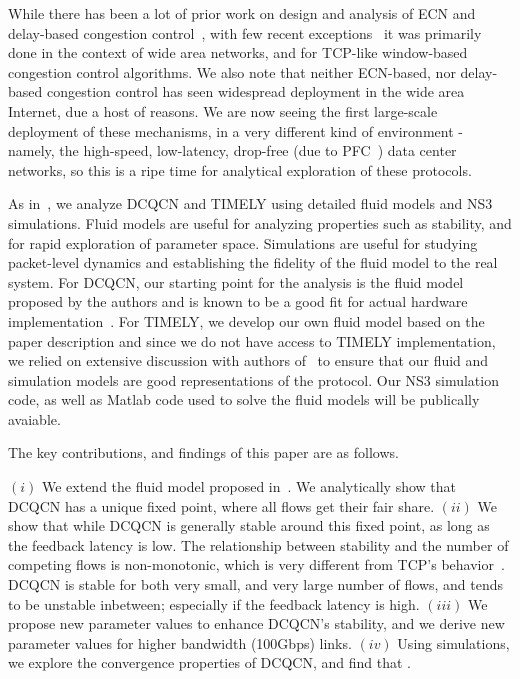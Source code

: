 
While there has been a lot of prior work on design and analysis of ECN and
delay-based congestion control~\cite{ecn, tcp-vegas, Hollot:PIController}, with few
recent exceptions~\cite{dctcp-analysis, qcn-analysis} it was primarily done in
the context of wide area networks, and for TCP-like window-based congestion
control algorithms.  We also note that neither ECN-based, nor delay-based
congestion control has seen widespread deployment in the wide area Internet, due
a host of reasons. We are now seeing the first large-scale deployment of these
mechanisms, in a very different kind of environment - namely, the high-speed,
low-latency, drop-free (due to PFC~\cite{pfc}) data center networks, so this is
a ripe time for analytical exploration of these protocols.


As in~\cite{dctcp-analysis, qcn-analysis}, we analyze DCQCN and TIMELY using
detailed fluid models and NS3 simulations. Fluid models are useful for analyzing
properties such as stability, and for rapid exploration of parameter space.
Simulations are useful for studying
packet-level dynamics and establishing the fidelity of the fluid model
to the real system. For DCQCN, our starting point for the analysis is
the fluid model
proposed by the authors and is known to be a good fit for
actual hardware implementation~\cite{dcqcn}. For TIMELY, we develop
our own fluid model based on the paper description and since we do not have access to
TIMELY implementation, we relied on extensive discussion with authors
of~\cite{timely} to ensure that our fluid and simulation models are good
representations of the protocol. Our NS3 simulation code, as well as Matlab code
used to solve the fluid models will be publically avaiable.


The key contributions, and findings of this paper are as follows.

 $(i)$ We extend the fluid model proposed in~\cite{dcqcn}. We
analytically show that DCQCN has a unique fixed point, where all flows get their
fair share. $(ii)$ We show that while DCQCN is generally stable around this
fixed point, as long as the feedback latency is low. The relationship between
stability and the number of competing flows is non-monotonic, which is very
different from TCP's behavior~\cite{misra:TAC2002}. DCQCN is stable for
both very small, and very large number of flows, and tends to be unstable
inbetween; especially if the feedback latency is high.  $(iii)$ We propose new
parameter values to enhance DCQCN's stability, and we derive new parameter
values for higher bandwidth (100Gbps) links. $(iv)$ Using simulations, we
explore the convergence properties of DCQCN, and find that .

